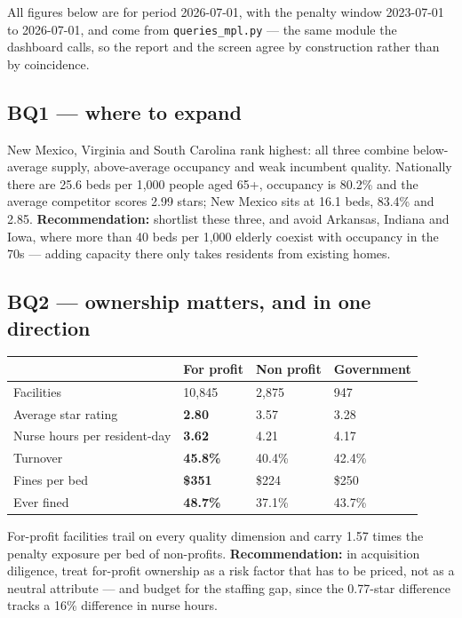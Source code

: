 \documentclass[11pt,a4paper]{article}
\newcommand{\sansall}{\sffamily}
\newcommand{\code}[1]{\texttt{#1}}
\begin{document}
All figures below are for period 2026-07-01, with the penalty window
2023-07-01 to 2026-07-01, and come from \code{queries\_mpl.py} — the same module
the dashboard calls, so the report and the screen agree by construction rather
than by coincidence.

\subsection{BQ1 — where to expand}

New Mexico, Virginia and South Carolina rank highest: all three combine
below-average supply, above-average occupancy and weak incumbent quality.
Nationally there are 25.6 beds per 1{,}000 people aged 65+, occupancy is 80.2\%
and the average competitor scores 2.99 stars; New Mexico sits at 16.1 beds,
83.4\% and 2.85. \textbf{Recommendation:} shortlist these three, and avoid
Arkansas, Indiana and Iowa, where more than 40 beds per 1{,}000 elderly coexist
with occupancy in the 70s — adding capacity there only takes residents from
existing homes.

\subsection{BQ2 — ownership matters, and in one direction}

\begin{table}[htbp]\centering\small
\begin{tabular}{L{4.4cm} R{2.6cm} R{2.6cm} R{2.6cm}}
\toprule
& \sansall\bfseries For profit & \sansall\bfseries Non profit &
\sansall\bfseries Government \\
\midrule
Facilities & 10{,}845 & 2{,}875 & 947 \\
Average star rating & \textbf{2.80} & 3.57 & 3.28 \\
Nurse hours per resident-day & \textbf{3.62} & 4.21 & 4.17 \\
Turnover & \textbf{45.8\%} & 40.4\% & 42.4\% \\
Fines per bed & \textbf{\$351} & \$224 & \$250 \\
Ever fined & \textbf{48.7\%} & 37.1\% & 43.7\% \\
\bottomrule
\end{tabular}
\end{table}

For-profit facilities trail on every quality dimension and carry 1.57 times the
penalty exposure per bed of non-profits. \textbf{Recommendation:} in
acquisition diligence, treat for-profit ownership as a risk factor that has to
be priced, not as a neutral attribute — and budget for the staffing gap, since
the 0.77-star difference tracks a 16\% difference in nurse hours.
\end{document}
